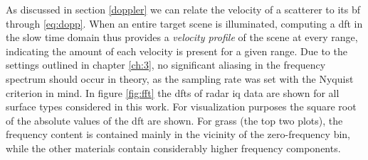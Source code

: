 As discussed in section \ref{doppler} we can relate the velocity of a scatterer to its \gls{bf} through \eqref{eq:dopp}. When an entire target scene is illuminated, computing a \gls{dft} in the slow time domain thus provides a \emph{velocity profile} of the scene at every range, indicating the amount of each velocity is present for a given range. Due to the settings outlined in chapter \ref{ch:3}, no significant aliasing in the frequency spectrum should occur in theory, as the sampling rate was set with the Nyquist criterion in mind. In figure \ref{fig:fft} the \gls{dft}s of radar \gls{iq} data are shown for all surface types considered in this work. For visualization purposes the square root of the absolute values of the \gls{dft} are shown. For grass (the top two plots), the frequency content is contained mainly in the vicinity of the zero-frequency bin, while the other materials contain considerably higher frequency components. %





